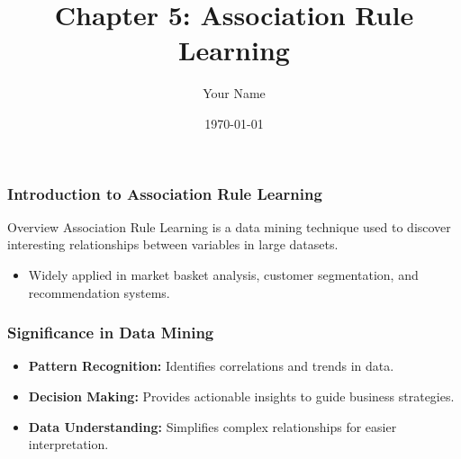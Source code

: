 \documentclass{beamer}
\title{Chapter 5: Association Rule Learning}
\author{Your Name}
\institute{Your Institution}
\date{\today}
\begin{document}
\frame{\titlepage}

\begin{frame}[fragile]
    \frametitle{Introduction to Association Rule Learning}
    \begin{block}{Overview}
        Association Rule Learning is a data mining technique used to discover interesting relationships between variables in large datasets.
    \end{block}
    \begin{itemize}
        \item Widely applied in market basket analysis, customer segmentation, and recommendation systems.
    \end{itemize}
\end{frame}

\begin{frame}[fragile]
    \frametitle{Significance in Data Mining}
    \begin{itemize}
        \item \textbf{Pattern Recognition:} Identifies correlations and trends in data.
        \item \textbf{Decision Making:} Provides actionable insights to guide business strategies.
        \item \textbf{Data Understanding:} Simplifies complex relationships for easier interpretation.
    \end{itemize}
\end{frame}
\end{document}
